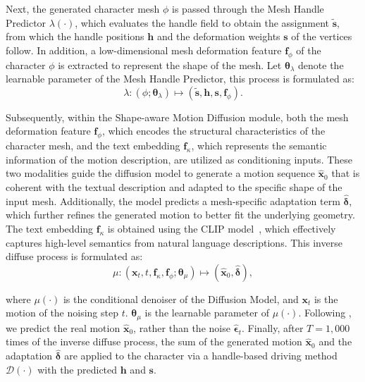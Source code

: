 \documentclass[lettersize,journal]{IEEEtran}
\begin{document}
Next, the generated character mesh $\phi$ is passed through the Mesh Handle Predictor $\lambda(\cdot)$, which evaluates the handle field to obtain the assignment $\tilde{\bm{s}}$, from which the handle positions $\bm{h}$ and the deformation weights $\bm{s}$ of the vertices follow. In addition, a low-dimensional mesh deformation feature $\bm{f}_{\phi}$ of the character $\phi$ is extracted to represent the shape of the mesh. Let  $\bm{\theta}_{\lambda}$ denote the learnable parameter of the Mesh Handle Predictor, this process is formulated as:
\begin{equation} \label{Eq.2}
\lambda : (\phi; \bm{\theta}_{\lambda}) \mapsto (\tilde{\bm{s}}, \bm{h}, \bm{s}, \bm{f}_{\phi}).
\end{equation}

Subsequently, within the Shape-aware Motion Diffusion module, both the mesh deformation feature $\bm{f}_{\phi}$, which encodes the structural characteristics of the character mesh, and the text embedding $\bm{f}_{\kappa}$, which represents the semantic information of the motion description, are utilized as conditioning inputs. These two modalities guide the diffusion model to generate a motion sequence $\hat{\bm{x}}_{0}$ that is coherent with the textual description and adapted to the specific shape of the input mesh. Additionally, the model predicts a mesh-specific adaptation term $\hat{\bm{\delta}}$, which further refines the generated motion to better fit the underlying geometry.
The text embedding $\bm{f}_{\kappa}$ is obtained using the CLIP model~\cite{radford2021learning}, which effectively captures high-level semantics from natural language descriptions. This inverse diffuse process is formulated as:
\begin{equation} \label{Eq.3}
\mu : (\bm{x}_{t}, t, \bm{f}_{\kappa}, \bm{f}_{\phi}; \bm{\theta}_{\mu}) \mapsto (\hat{\bm{x}}_{0}, \hat{\bm{\delta}}),
\end{equation}

where $\mu(\cdot)$ is the conditional denoiser of the Diffusion Model, and $\bm{x}_{t}$ is the motion of the noising step $t$. $\bm{\theta}_{\mu}$ is the learnable parameter of $\mu(\cdot)$. Following \cite{tevet2022human}, we predict the real motion $\hat{\bm{x}}_{0}$, rather than the noise $\hat{\bm{\epsilon}}_{t}$. Finally, after $T=1,000$ times of the inverse diffuse process, the sum of the generated motion $\hat{\bm{x}}_{0}$ and the adaptation $\hat{\bm{\delta}}$ are applied to the character via a handle-based driving method $\mathcal{D}(\cdot)$ with the predicted $\bm{h}$ and $\bm{s}$.
\end{document}
